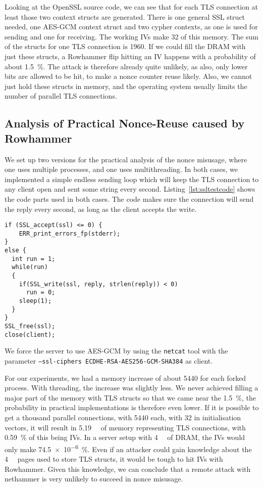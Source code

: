 Looking at the OpenSSL source code, we can see that for each TLS connection at
least those two context structs are generated. There is one general SSL struct
needed, one AES-GCM context struct and two cypher contexts, as one is used for
sending and one for receiving. The working IVs make \SI{32}{\byte} of this
memory. The sum of the structs for one TLS connection is \SI{1960}{\byte}. If we
could fill the DRAM with just these structs, a Rowhammer flip hitting an IV
happens with a probability of about \SI{1.5}{\percent}. The attack is
therefore already quite unlikely, as also, only lower bits are allowed to be
hit, to make a nonce counter reuse likely. Also, we cannot just hold these
structs in memory, and the operating system usually limits the number of
parallel TLS connections.

\subsection{Analysis of Practical Nonce-Reuse caused by Rowhammer}

We set up two versions for the practical analysis of the nonce misusage, where
one uses multiple processes, and one uses multithreading. In both cases, we
implemented a simple endless sending loop which will keep the TLS connection to
any client open and sent some string every second. Listing~\ref{lst:ssltestcode}
shows the code parts used in both cases. The code makes sure the connection will
send the reply every second, as long as the client accepts the write.

\begin{minipage}{\linewidth}
\begin{lstlisting}[style=CStyle,
                   caption={},
                   label={lst:ssltestcode}]
if (SSL_accept(ssl) <= 0) {
    ERR_print_errors_fp(stderr);
}
else {
  int run = 1;
  while(run)
  {
    if(SSL_write(ssl, reply, strlen(reply)) < 0)
      run = 0;
    sleep(1);
  }
}
SSL_free(ssl);
close(client);
\end{lstlisting}
\end{minipage}

We force the server to use AES-GCM by using the \texttt{netcat} tool with the
parameter \texttt{--ssl-ciphers ECDHE-RSA-AES256-GCM-SHA384} as client.

For our experiments, we had a memory increase of about \SI{5440}{\byte} for each
forked process. With threading, the increase was slightly less. We never
achieved filling a major part of the memory with TLS structs so that we came
near the \SI{1.5}{\percent}, the probability in practical implementations is
therefore even lower. If it is possible to get a thousand parallel connections,
with \SI{5440}{\byte} each, with \SI{32}{\byte} in initialisation vectors, it
will result in \SI{5.19}{\mega\byte} of memory representing TLS connections,
with \SI{0.59}{\percent} of this being IVs. In a server setup with
\SI{4}{\giga\byte} of DRAM, the IVs would only make \SI{74.5e-6}{\percent}. Even
if an attacker could gain knowledge about the \SI{4}{\kilo\byte} pages used to
store TLS structs, it would be tough to hit IVs with Rowhammer. Given this
knowledge, we can conclude that a remote attack with nethammer is very unlikely
to succeed in nonce misusage.


